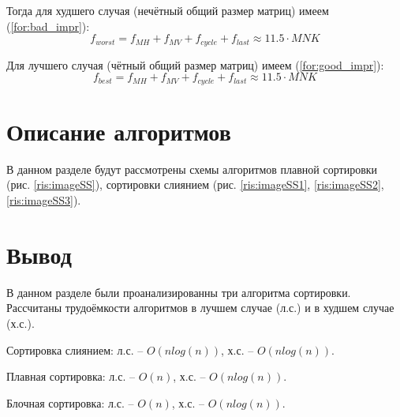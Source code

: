 Тогда для худшего случая (нечётный общий размер матриц) имеем (\ref{for:bad_impr}):
\begin{equation}
	\label{for:bad_impr}
	f_{worst} = f_{MH} + f_{MV} + f_{cycle} + f_{last} \approx 11.5 \cdot MNK
\end{equation}

Для лучшего случая (чётный общий размер матриц) имеем (\ref{for:good_impr}):
\begin{equation}
	\label{for:good_impr}
	f_{best} = f_{MH} + f_{MV} + f_{cycle} + f_{last} \approx 11.5 \cdot MNK
\end{equation}

\section{Описание алгоритмов}
В данном разделе будут рассмотрены схемы алгоритмов плавной сортировки (рис. \ref{ris:imageSS}), сортировки слиянием (рис. \ref{ris:imageSS1}, \ref{ris:imageSS2}, \ref{ris:imageSS3}).
\begin{center}
	

\newpage
	\centering
	\def\svgwidth{7cm}
	
	\label{ris:imageSS}
\newpage
	\centering
	\def\svgwidth{3.5cm}
	
	\label{ris:imageSS1}
\newpage
	\centering
	\def\svgwidth{8cm}
	
	\label{ris:imageSS2}
\newpage
	\centering
		\def\svgwidth{12cm}
	
	\label{ris:imageSS3}

\end{center}
\newpage

\section*{Вывод}
В данном разделе были проанализированны три алгоритма сортировки. Рассчитаны трудоёмкости алгоритмов в лучшем случае (л.с.) и в худшем случае (х.с.).

Сортировка слиянием: л.с. -- $O(nlog(n))$, х.с. -- $O(nlog(n))$.

Плавная сортировка: л.с. -- $O(n)$,  х.с. --  $O(nlog(n))$.

Блочная сортировка: л.с. -- $O(n)$,  х.с. -- $O(nlog(n))$.